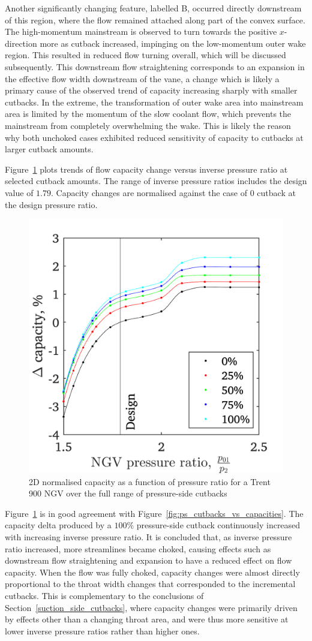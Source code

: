 \documentclass[a4paper, 11pt, oneside]{report}
\begin{document}
Another significantly changing feature, labelled B, occurred directly downstream of this region, where the flow remained attached along part of the convex surface. The high-momentum mainstream is observed to turn towards the positive $x$-direction more as cutback increased, impinging on the low-momentum outer wake region. This resulted in reduced flow turning overall, which will be discussed subsequently. This downstream flow straightening corresponds to an expansion in the effective flow width downstream of the vane, a change which is likely a primary cause of the observed trend of capacity increasing sharply with smaller cutbacks. In the extreme, the transformation of outer wake area into mainstream area is limited by the momentum of the slow coolant flow, which prevents the mainstream from completely overwhelming the wake. This is likely the reason why both unchoked cases exhibited reduced sensitivity of capacity to cutbacks at larger cutback amounts.

Figure~\ref{fig:ps_cutbacks_capacities_trends} plots trends of flow capacity change versus inverse pressure ratio at selected cutback amounts. The range of inverse pressure ratios includes the design value of $1.79$. Capacity changes are normalised against the case of $0$ cutback at the design pressure ratio.

\begin{figure}[H]
	\centering
	\includegraphics[width=.45\textwidth]{figs/ps_cutbacks_capacities_trends.png}
	\caption{2D normalised capacity as a function of pressure ratio for a Trent 900 NGV over the full range of pressure-side cutbacks}
    \label{fig:ps_cutbacks_capacities_trends}
\end{figure}

Figure~\ref{fig:ps_cutbacks_capacities_trends} is in good agreement with Figure~\ref{fig:ps_cutbacks_vs_capacities}. The capacity delta produced by a $100\%$ pressure-side cutback continuously increased with increasing inverse pressure ratio. It is concluded that, as inverse pressure ratio increased, more streamlines became choked, causing effects such as downstream flow straightening and expansion to have a reduced effect on flow capacity. When the flow was fully choked, capacity changes were almost directly proportional to the throat width changes that corresponded to the incremental cutbacks. This is complementary to the conclusions of Section~\ref{suction_side_cutbacks}, where capacity changes were primarily driven by effects other than a changing throat area, and were thus more sensitive at lower inverse pressure ratios rather than higher ones. 
\end{document}
